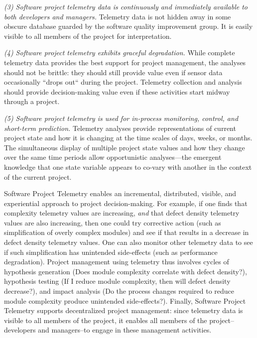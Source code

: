 {\em (3) Software project telemetry data is continuously and immediately
available to both developers and managers.}  Telemetry data is not hidden
away in some obscure database guarded by the software quality improvement
group.  It is easily visible to all members of the project for
interpretation.

{\em (4) Software project telemetry exhibits graceful degradation.}  While
complete telemetry data provides the best support for project management,
the analyses should not be brittle: they should still provide value even if
sensor data occasionally ``drops out`` during the project. Telemetry
collection and analysis should provide decision-making value even if these
activities start midway through a project.
         
{\em (5) Software project telemetry is used for in-process monitoring, control,
and short-term prediction.} Telemetry analyses provide representations of
current project state and how it is changing at the time scales of days,
weeks, or months.  The simultaneous display of multiple project state
values and how they change over the same time periods allow opportunistic
analyses---the emergent knowledge that one state variable appears to
co-vary with another in the context of the current project.

Software Project Telemetry enables an incremental, distributed,
visible, and experiential approach to project decision-making. For example,
if one finds that complexity telemetry values are increasing, {\em and}
that defect density telemetry values are also increasing, then one could
try corrective action (such as simplification of overly complex modules)
and see if that results in a decrease in defect density telemetry
values. One can also monitor other telemetry data to see if such
simplification has unintended side-effects (such as performance
degradation).  Project management using telemetry thus involves cycles of
hypothesis generation (Does module complexity correlate with defect
density?), hypothesis testing (If I reduce module complexity, then will
defect density decrease?), and impact analysis (Do the process changes
required to reduce module complexity produce unintended side-effects?).
Finally, Software Project Telemetry supports decentralized project
management: since telemetry data is visible to all members of the project,
it enables all members of the project--developers and managers--to engage
in these management activities.  

